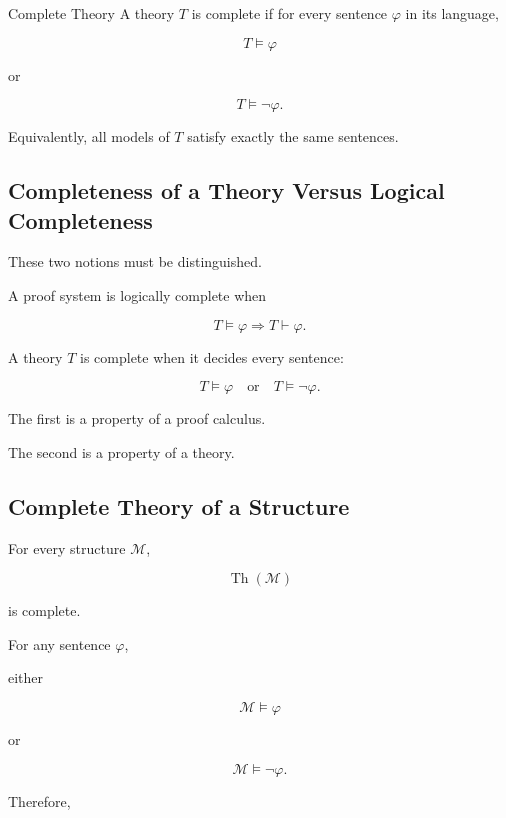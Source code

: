 \begin{definitionbox}{Complete Theory}
A theory \(T\) is complete if for every sentence \(\varphi\) in its
language,

\[
\boxed{
T\models\varphi
}
\]

or

\[
\boxed{
T\models\neg\varphi.
}
\]
\end{definitionbox}

Equivalently, all models of \(T\) satisfy exactly the same sentences.

\subsection{Completeness of a Theory Versus Logical Completeness}
\label{subsec:theory-vs-logical-completeness}

These two notions must be distinguished.

A proof system is logically complete when

\[
\boxed{
T\models\varphi
\Longrightarrow
T\vdash\varphi.
}
\]

A theory \(T\) is complete when it decides every sentence:

\[
\boxed{
T\models\varphi
\quad
\text{or}
\quad
T\models\neg\varphi.
}
\]

The first is a property of a proof calculus.

The second is a property of a theory.

\subsection{Complete Theory of a Structure}
\label{subsec:complete-theory-structure}

For every structure \(\mathcal{M}\),

\[
\operatorname{Th}(\mathcal{M})
\]

is complete.

For any sentence \(\varphi\),

either

\[
\mathcal{M}\models\varphi
\]

or

\[
\mathcal{M}\models\neg\varphi.
\]

Therefore,

